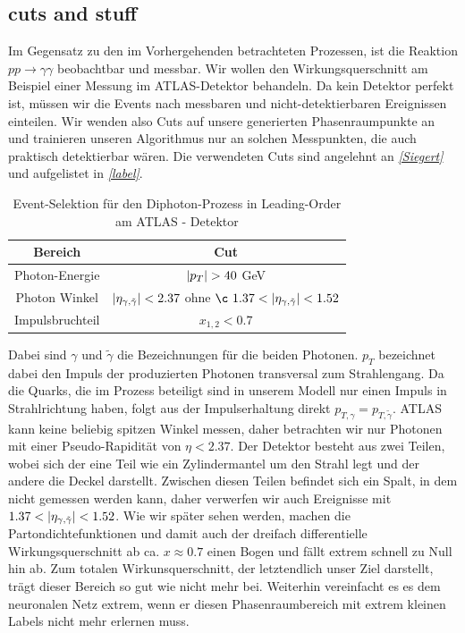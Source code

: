 \subsection{cuts and stuff}
Im Gegensatz zu den im Vorhergehenden betrachteten Prozessen, ist die Reaktion $pp \rightarrow \gamma \gamma$ beobachtbar und messbar. Wir wollen den Wirkungsquerschnitt am Beispiel einer Messung im ATLAS-Detektor behandeln. Da kein Detektor perfekt ist, müssen wir die Events nach messbaren und nicht-detektierbaren Ereignissen einteilen. Wir wenden also Cuts auf unsere generierten Phasenraumpunkte an und trainieren unseren Algorithmus nur an solchen Messpunkten, die auch praktisch detektierbar wären. Die verwendeten Cuts sind angelehnt an \textit{\autoref{Siegert}} und aufgelistet in \textit{\autoref{label}}.
\begin{table}
	\centering
	\begin{tabular}{|c|c|}
		\hline
		Bereich & Cut \\
		\hline
		Photon-Energie & $\abs{p_T} > 40$ GeV \\
		Photon Winkel & $\abs{\eta_{\gamma, \tilde{\gamma}}} < 2.37$ ohne $¸1.37 < \abs{\eta_{\gamma, \tilde{\gamma}}} < 1.52$ \\
		Impulsbruchteil & $x_{1,2} < 0.7 $\\
		\hline
	\end{tabular}
	\caption{Event-Selektion für den Diphoton-Prozess in Leading-Order am ATLAS - Detektor}
\end{table}
Dabei sind $\gamma$ und $\tilde{\gamma}$ die Bezeichnungen für die beiden Photonen. $p_T$ bezeichnet dabei den Impuls der produzierten Photonen transversal zum Strahlengang. Da die Quarks, die im Prozess beteiligt sind in unserem Modell nur einen Impuls in Strahlrichtung haben, folgt aus der Impulserhaltung direkt $p_{T,\gamma} = p_{T,\tilde{\gamma}}$. ATLAS kann keine beliebig spitzen Winkel messen, daher betrachten wir nur Photonen mit einer Pseudo-Rapidität von $\eta < 2.37$. Der Detektor besteht aus zwei Teilen, wobei sich der eine Teil wie ein Zylindermantel um den Strahl legt und der andere die Deckel darstellt. Zwischen diesen Teilen befindet sich ein Spalt, in dem nicht gemessen werden kann, daher verwerfen wir auch Ereignisse mit $1.37 < \abs{\eta_{\gamma, \tilde{\gamma}}} < 1.52$. Wie wir später sehen werden, machen die Partondichtefunktionen und damit auch der dreifach differentielle Wirkungsquerschnitt ab ca. $x \approx 0.7$ einen Bogen und fällt extrem schnell zu Null hin ab. Zum totalen Wirkunsquerschnitt, der letztendlich unser Ziel darstellt, trägt dieser Bereich so gut wie nicht mehr bei. Weiterhin vereinfacht es es dem neuronalen Netz extrem, wenn er diesen Phasenraumbereich mit extrem kleinen Labels nicht mehr erlernen muss.
